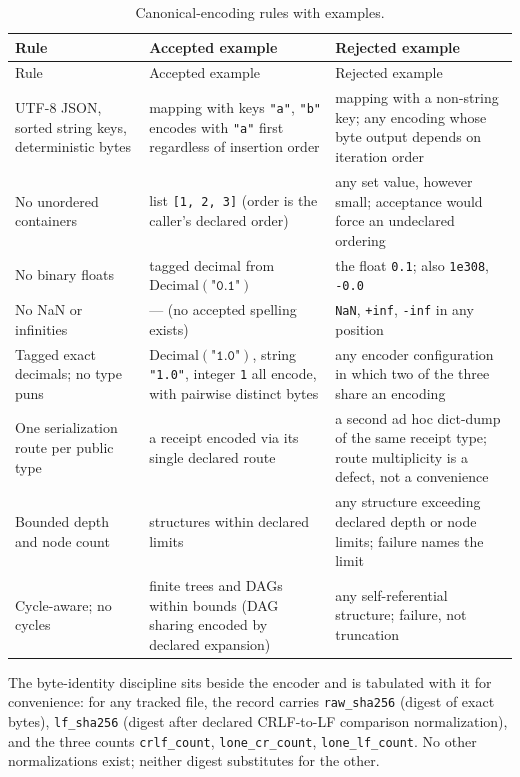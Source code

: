 \begin{longtable}{@{}p{}p{}p{}@{}}
\caption{Canonical-encoding rules with examples.}\label{tables:tab:encoding}\\
\toprule
Rule & Accepted example & Rejected example \\
\midrule
\endfirsthead
\toprule
Rule & Accepted example & Rejected example \\
\midrule
\endhead
\bottomrule
\endfoot
UTF-8 JSON, sorted string keys, deterministic bytes & mapping with keys \texttt{"a"}, \texttt{"b"} encodes with \texttt{"a"} first regardless of insertion order & mapping with a non-string key; any encoding whose byte output depends on iteration order \\
\addlinespace
No unordered containers & list \texttt{[1, 2, 3]} (order is the caller's declared order) & any set value, however small; acceptance would force an undeclared ordering \\
\addlinespace
No binary floats & tagged decimal from $\mathrm{Decimal}(\texttt{"0.1"})$ & the float \texttt{0.1}; also \texttt{1e308}, \texttt{-0.0} \\
\addlinespace
No NaN or infinities & --- (no accepted spelling exists) & \texttt{NaN}, \texttt{+inf}, \texttt{-inf} in any position \\
\addlinespace
Tagged exact decimals; no type puns & $\mathrm{Decimal}(\texttt{"1.0"})$, string \texttt{"1.0"}, integer \texttt{1} all encode, with pairwise distinct bytes & any encoder configuration in which two of the three share an encoding \\
\addlinespace
One serialization route per public type & a receipt encoded via its single declared route & a second ad hoc dict-dump of the same receipt type; route multiplicity is a defect, not a convenience \\
\addlinespace
Bounded depth and node count & structures within declared limits & any structure exceeding declared depth or node limits; failure names the limit \\
\addlinespace
Cycle-aware; no cycles & finite trees and DAGs within bounds (DAG sharing encoded by declared expansion) & any self-referential structure; failure, not truncation \\
\end{longtable}

The byte-identity discipline sits beside the encoder and is tabulated with it for convenience: for any tracked file, the record carries \texttt{raw\_sha256} (digest of exact bytes), \texttt{lf\_sha256} (digest after declared CRLF-to-LF comparison normalization), and the three counts \texttt{crlf\_count}, \texttt{lone\_cr\_count}, \texttt{lone\_lf\_count}. No other normalizations exist; neither digest substitutes for the other.


